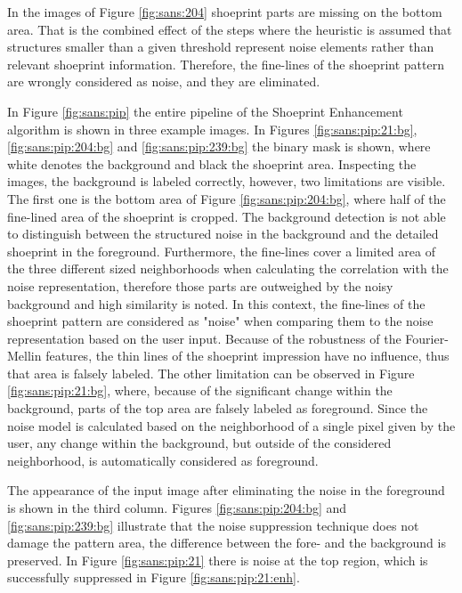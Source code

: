 \documentclass[draft,final]{vutinfth} %
\begin{document}
\par
In the images of Figure \ref{fig:sans:204} shoeprint parts are missing on the bottom area.
That is the combined effect of the steps where the heuristic is assumed that structures smaller than a given threshold represent noise elements rather than relevant shoeprint information. 
Therefore, the fine-lines of the shoeprint pattern are wrongly considered as noise, and they are eliminated.
\par
In Figure \ref{fig:sans:pip} the entire pipeline of the Shoeprint Enhancement algorithm is shown in three example images.
In Figures  \ref{fig:sans:pip:21:bg}, \ref{fig:sans:pip:204:bg} and \ref{fig:sans:pip:239:bg} the binary mask is shown, where white denotes the background and black the shoeprint area.
Inspecting the images, the background is labeled correctly, however, two limitations are visible.
The first one is the bottom area of Figure \ref{fig:sans:pip:204:bg}, where half of the fine-lined area of the shoeprint is cropped.
The background detection is not able to distinguish between the structured noise in the background and the detailed shoeprint in the foreground.
Furthermore, the fine-lines cover a limited area of the three different sized neighborhoods when calculating the correlation with the noise representation, therefore those parts are outweighed by the noisy background and high similarity is noted.
In this context, the fine-lines of the shoeprint pattern are considered as "noise" when comparing them to the noise representation based on the user input.
Because of the robustness of the Fourier-Mellin features, the thin lines of the shoeprint impression have no influence, thus that area is falsely labeled.
The other limitation can be observed in Figure \ref{fig:sans:pip:21:bg}, where, because of the significant change within the background, parts of the top area are falsely labeled as foreground.
Since the noise model is calculated based on the neighborhood of a single pixel given by the user, any change within the background, but outside of the considered neighborhood, is automatically considered as foreground.
\par
The appearance of the input image after eliminating the noise in the foreground is shown in the third column.
Figures \ref{fig:sans:pip:204:bg} and \ref{fig:sans:pip:239:bg} illustrate that the noise suppression technique does not damage the pattern area, the difference between the fore- and the background is preserved.
In Figure \ref{fig:sans:pip:21} there is noise at the top region, which is successfully suppressed in Figure \ref{fig:sans:pip:21:enh}.
\end{document}
